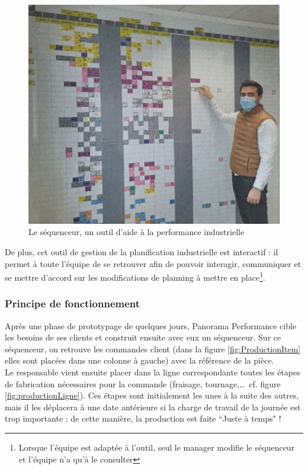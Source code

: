 \begin{figure}[!h]
    \centering
    \includegraphics[scale=0.4]{img/sequenceur_2.jpeg}
    \caption{Le séquenceur, un outil d'aide à la performance industrielle}
    \label{fig:Séquenceur}
\end{figure}

De plus, cet outil de gestion de la planification industrielle est interactif : il permet à toute l'équipe de se retrouver afin de pouvoir interagir, communiquer et se mettre d'accord sur les modifications de planning à mettre en place\footnote{Lorsque l'équipe est adaptée à l'outil, seul le manager modifie le séquenceur et l'équipe n'a qu'à le consulter}.\\

\subsubsection*{Principe de fonctionnement}

Après une phase de prototypage de quelques jours, Panorama Performance cible les besoins de ses clients et construit ensuite avec eux un séquenceur. Sur ce séquenceur, on retrouve les commandes client (dans la figure \ref{fig:ProductionItem} elles sont placées dans une colonne à gauche) avec la référence de la pièce.\\

Le responsable vient ensuite placer dans la ligne correspondante toutes les étapes de fabrication nécessaires pour la commande (fraisage, tournage,\dots~cf. figure \ref{fig:productionLigne}). Ces étapes sont initialement les unes à la suite des autres, mais il les déplacera à une date antérieure si la charge de travail de la journée est trop importante ; de cette manière, la production est faite “Juste à temps" !\\

